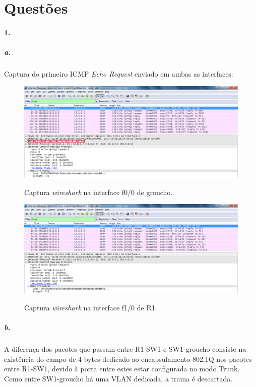 \section*{Questões}
\paragraph{1.}

\subparagraph{a.}
Captura do primeiro ICMP \emph{Echo Request} enviado em ambas as interfaces:

\begin{figure}[h]
\centering
\includegraphics[width=1\textwidth, height=0.32\textheight]{1_interface00-groucho.png}
\label{fig:2-capturaWireshark}
\caption{Captura \emph{wireshark} na interface \textsf{f0/0} de \textsf{groucho}.}
\end{figure}

\begin{figure}[h]
\centering
\includegraphics[width=1\textwidth, height=0.32\textheight]{1_interface10-R1.png}
\label{fig:3-capturaWireshark}
\caption{Captura \emph{wireshark} na interface \textsf{f1/0} de \textsf{R1}.}
\end{figure}


\subparagraph{b.}
A diferença dos pacotes que passam entre  R1-SW1 e SW1-groucho consiste na existência do campo de 4 bytes dedicado ao encapsulamento 802.1Q nos pacotes entre R1-SW1, devido à porta entre estes estar configurada no modo Trunk. Como entre SW1-groucho há uma VLAN dedicada, a trama é descartada.

